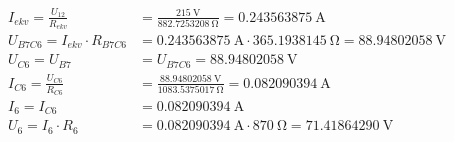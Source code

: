 \begin{align*}
    I_{ekv} = \frac{U_{12}}{R_{ekv}} &= \frac{\SI{215}{\volt}}{\SI{882.7253208}{\ohm}} = \SI{0.243563875}{\ampere}\\
    U_{B7C6} = I_{ekv} \cdot R_{B7C6} &= \SI{0.243563875}{\ampere} \cdot \SI{365.1938145}{\ohm} = \SI{88.94802058}{\volt}\\
    U_{C6} = U_{B7} &= U_{B7C6} = \SI{88.94802058}{\volt}\\
    I_{C6} = \frac{U_{C6}}{R_{C6}} &= \frac{\SI{88.94802058}{\volt}}{\SI{1083.5375017}{\ohm}} = \SI{0.082090394}{\ampere}\\
    I_6 = I_{C6} &= \SI{0.082090394}{\ampere}\\
    U_{6} = I_{6} \cdot R_{6} &= \SI{0.082090394}{\ampere} \cdot \SI{870}{\ohm} = \SI{71.41864290}{\volt}\\
\end{align*}